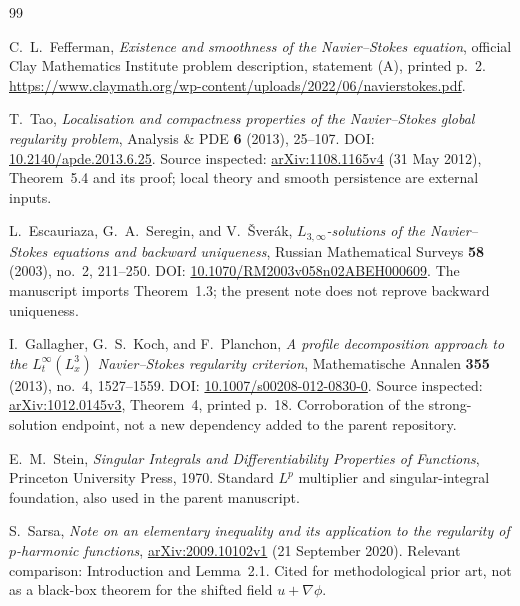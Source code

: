 \documentclass[11pt,a4paper]{article}
\theoremstyle{definition}
\begin{document}
\begin{thebibliography}{99}
\raggedright
{}

C.~L.~Fefferman, \emph{Existence and smoothness of the Navier--Stokes equation}, official Clay Mathematics Institute problem description, statement (A), printed p.~2.\newline
\url{https://www.claymath.org/wp-content/uploads/2022/06/navierstokes.pdf}.

T.~Tao, \emph{Localisation and compactness properties of the Navier--Stokes global regularity problem}, Analysis \& PDE \textbf{6} (2013), 25--107. DOI: \href{https://doi.org/10.2140/apde.2013.6.25}{10.2140/apde.2013.6.25}. Source inspected: \href{https://arxiv.org/abs/1108.1165v4}{arXiv:1108.1165v4} (31 May 2012), Theorem~5.4 and its proof; local theory and smooth persistence are external inputs.

L.~Escauriaza, G.~A.~Seregin, and V.~\v Sver\'ak, \emph{$L_{3,\infty}$-solutions of the Navier--Stokes equations and backward uniqueness}, Russian Mathematical Surveys \textbf{58} (2003), no.~2, 211--250. DOI: \href{https://doi.org/10.1070/RM2003v058n02ABEH000609}{10.1070/RM2003v058n02ABEH000609}. The manuscript imports Theorem~1.3; the present note does not reprove backward uniqueness.

I.~Gallagher, G.~S.~Koch, and F.~Planchon, \emph{A profile decomposition approach to the $L^\infty_t(L^3_x)$ Navier--Stokes regularity criterion}, Mathematische Annalen \textbf{355} (2013), no.~4, 1527--1559. DOI: \href{https://doi.org/10.1007/s00208-012-0830-0}{10.1007/s00208-012-0830-0}. Source inspected: \href{https://arxiv.org/abs/1012.0145v3}{arXiv:1012.0145v3}, Theorem~4, printed p.~18. Corroboration of the strong-solution endpoint, not a new dependency added to the parent repository.

E.~M.~Stein, \emph{Singular Integrals and Differentiability Properties of Functions}, Princeton University Press, 1970. Standard $L^p$ multiplier and singular-integral foundation, also used in the parent manuscript.

S.~Sarsa, \emph{Note on an elementary inequality and its application to the regularity of $p$-harmonic functions}, \href{https://arxiv.org/abs/2009.10102v1}{arXiv:2009.10102v1} (21 September 2020). Relevant comparison: Introduction and Lemma~2.1. Cited for methodological prior art, not as a black-box theorem for the shifted field $u+\nabla\phi$.


\end{thebibliography}
\end{document}
